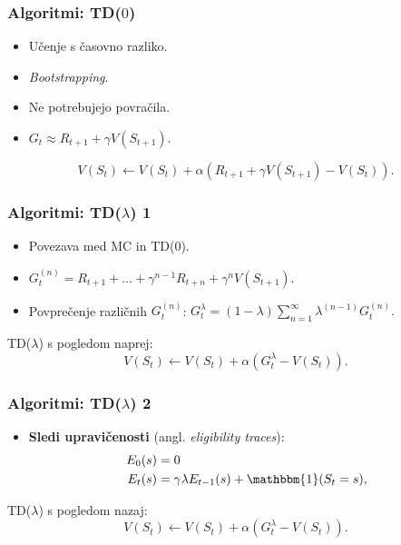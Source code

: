 \documentclass{beamer}    %
\begin{document}
\begin{frame}
    \frametitle{Algoritmi: TD($0$)}
    \begin{itemize}
        \item Učenje s časovno razliko.
        \item \textit{Bootstrapping}. 
        \item Ne potrebujejo povračila.
        \item $G_t \approx R_{t+1} + \gamma V(S_{t+1})$.
    \end{itemize}

    \medskip
    $$
    V(S_t) \leftarrow V(S_t) + \alpha (R_{t+1} + \gamma V(S_{t+1}) - V(S_t)).
    $$
\end{frame}


\begin{frame}
    \frametitle{Algoritmi: TD($\lambda$) 1}
    \begin{itemize}
        \item Povezava med MC in TD($0$).
        \item $G_t^{(n)} = R_{t+1} + \dots + \gamma^{n-1} R_{t+n} + \gamma^n V(S_{t+1}).$
        \item Povprečenje različnih $G_t^{(n)}$: $G_t^\lambda = (1 - \lambda) \sum_{n=1}^\infty 
                                                 \lambda^{(n-1)} G_t^{(n)}.$
    \end{itemize}

    \medskip
    \medskip
    \medskip
    TD($\lambda$) s pogledom naprej: 
    $$
    V(S_t) \leftarrow V(S_t) + \alpha (G_t^\lambda - V(S_t)).
    $$
\end{frame}


\begin{frame}
    \frametitle{Algoritmi: TD($\lambda$) 2}
    \begin{itemize}
        \item \textbf{Sledi upravičenosti} (angl. \textit{eligibility traces}):
        \begin{align*}
            E_0(s) &= 0 \\
            E_t(s) &= \gamma \lambda E_{t-1}(s) + \mathbbm{1}(S_t = s),
        \end{align*}
    \end{itemize}

    \medskip
    \medskip
    \medskip
    TD($\lambda$) s pogledom nazaj: 
    $$
    V(S_t) \leftarrow V(S_t) + \alpha (G_t^\lambda - V(S_t)).
    $$
\end{frame}
\end{document}
